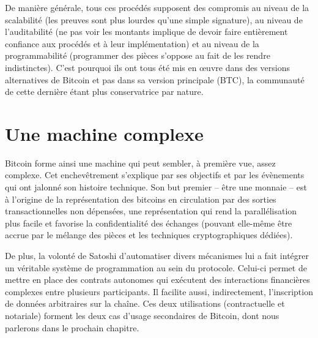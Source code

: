 De manière générale, tous ces procédés supposent des compromis au niveau de la scalabilité (les preuves sont plus lourdes qu'une simple signature), au niveau de l'auditabilité (ne pas voir les montants implique de devoir faire entièrement confiance aux procédés et à leur implémentation) et au niveau de la programmabilité (programmer des pièces s'oppose au fait de les rendre indistinctes). C'est pourquoi ils ont tous été mis en œuvre dans des versions alternatives de Bitcoin et pas dans sa version principale (BTC), la communauté de cette dernière étant plus conservatrice par nature.

\section*{Une machine complexe}

Bitcoin forme ainsi une machine qui peut sembler, à première vue, assez complexe. Cet enchevêtrement s'explique par ses objectifs et par les évènements qui ont jalonné son histoire technique. Son but premier -- être une monnaie -- est à l'origine de la représentation des bitcoins en circulation par des sorties transactionnelles non dépensées, une représentation qui rend la parallélisation plus facile et favorise la confidentialité des échanges (pouvant elle-même être accrue par le mélange des pièces et les techniques cryptographiques dédiées).

De plus, la volonté de Satoshi d'automatiser divers mécanismes lui a fait intégrer un véritable système de programmation au sein du protocole. Celui-ci permet de mettre en place des contrats autonomes qui exécutent des interactions financières complexes entre plusieurs participants. Il facilite aussi, indirectement, l'inscription de données arbitraires sur la chaîne. Ces deux utilisations (contractuelle et notariale) forment les deux cas d'usage secondaires de Bitcoin, dont nous parlerons dans le prochain chapitre.